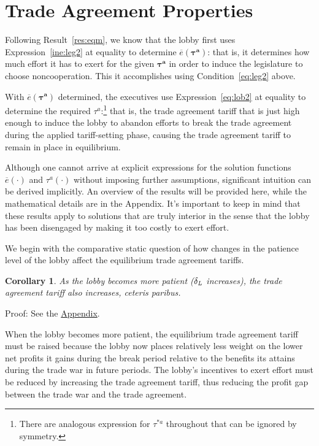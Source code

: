 \documentclass[authoryear, review]{elsarticle}
\newtheorem{corollary}{Corollary}
\newcommand{\ov}{\overline}
\newcommand{\bta}{\bm{\tau^a}}
\newcommand{\de}{\delta}
\begin{document}
\section{Trade Agreement Properties}
\label{sec:prop}
Following Result~\ref{res:eqm}, we know that the lobby first uses Expression~\ref{ine:leg2} at equality to determine $\ov{e}(\bta)$: that is, it determines how much effort it has to exert for the given $\bta$ in order to induce the legislature to choose noncooperation. This it accomplishes using Condition~\ref{eq:leg2} above.

With $\ov{e}(\bta)$ determined, the executives use Expression~\ref{eq:lob2} at equality to determine the required $\tau^a$:\footnote{There are analogous expression for $\tau^{*a}$ throughout that can be ignored by symmetry.} that is, the trade agreement tariff that is just high enough to induce the lobby to abandon efforts to break the trade agreement during the applied tariff-setting phase, causing the trade agreement tariff to remain in place in equilibrium.

Although one cannot arrive at explicit expressions for the solution functions $\ov{e}(\cdot)$ and $\tau^a(\cdot)$ without imposing further assumptions, significant intuition can be derived implicitly. An overview of the results will be provided here, while the mathematical details are in the Appendix. It's important to keep in mind that these results apply to solutions that are truly interior in the sense that the lobby has been disengaged by making it too costly to exert effort.

We begin with the comparative static question of how changes in the patience level of the lobby affect the equilibrium trade agreement tariffs.

\begin{corollary}
  As the lobby becomes more patient ($\de_\emph{L}$ increases), the trade agreement tariff also increases, \emph{ceteris paribus}.
  \label{cor:tdl}
\end{corollary}

Proof: See the \hyperlink{Cor_tdl}{Appendix}.

\noindent When the lobby becomes more patient, the equilibrium trade agreement tariff must be raised because the lobby now places relatively less weight on the lower net profits it gains during the break period relative to the benefits its attains during the trade war in future periods. The lobby's incentives to exert effort must be reduced by increasing the trade agreement tariff, thus reducing the profit gap between the trade war and the trade agreement.
\end{document}
